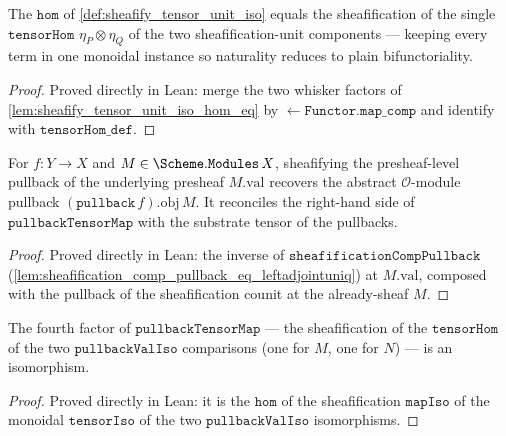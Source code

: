 \begin{lemma}
  \label{lem:sheafify_tensor_unit_iso_hom_eq_prime}
  The \(\mathtt{hom}\) of \cref{def:sheafify_tensor_unit_iso} equals the sheafification of
  the single \(\mathtt{tensorHom}\) \(\eta_P \otimes \eta_Q\) of the two sheafification-unit
  components --- keeping every term in one monoidal instance so naturality reduces to plain
  bifunctoriality.
\end{lemma}
\begin{proof}
  \leanok
  Proved directly in Lean: merge the two whisker factors of
  \cref{lem:sheafify_tensor_unit_iso_hom_eq} by \(\mathtt{\leftarrow Functor.map\_comp}\)
  and identify with \(\mathtt{tensorHom\_def}\).
\end{proof}

\begin{definition}
  \label{def:pullback_val_iso}
  For \(f : Y \to X\) and \(M \in \Scheme.\mathtt{Modules}\,X\), sheafifying the
  presheaf-level pullback of the underlying presheaf \(M.\mathrm{val}\) recovers the
  abstract \(\mathcal{O}\)-module pullback \((\mathtt{pullback}\,f).\mathrm{obj}\,M\). It
  reconciles the right-hand side of \(\mathtt{pullbackTensorMap}\) with the substrate
  tensor of the pullbacks.
\end{definition}
\begin{proof}
  \leanok
  Proved directly in Lean: the inverse of
  \(\mathtt{sheafificationCompPullback}\) (\cref{lem:sheafification_comp_pullback_eq_leftadjointuniq})
  at \(M.\mathrm{val}\), composed with the pullback of the sheafification counit at the
  already-sheaf \(M\).
\end{proof}

\begin{lemma}
  \label{lem:isiso_sheafify_tensorhom_pullbackvaliso}
  The fourth factor of \(\mathtt{pullbackTensorMap}\) --- the sheafification of the
  \(\mathtt{tensorHom}\) of the two \(\mathtt{pullbackValIso}\) comparisons (one for \(M\),
  one for \(N\)) --- is an isomorphism.
\end{lemma}
\begin{proof}
  \leanok
  Proved directly in Lean: it is the \(\mathtt{hom}\) of the sheafification \(\mathtt{mapIso}\)
  of the monoidal \(\mathtt{tensorIso}\) of the two \(\mathtt{pullbackValIso}\) isomorphisms.
\end{proof}

